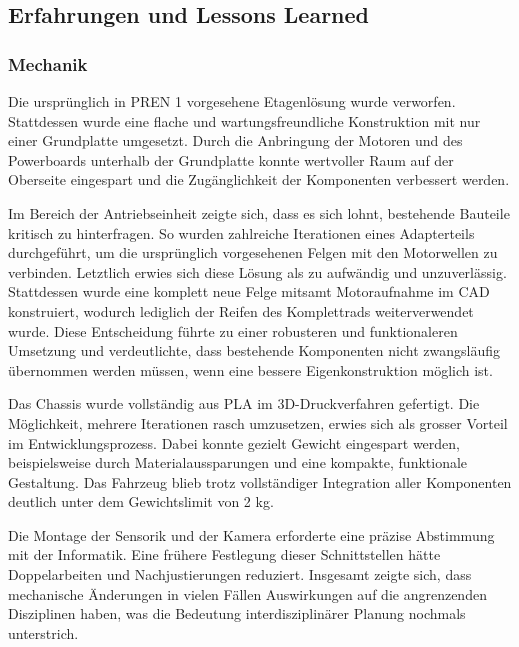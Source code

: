 \documentclass[main.tex]{subfiles} %
\begin{document}

\subsection{Erfahrungen und Lessons Learned}

\subsubsection{Mechanik}
Die ursprünglich in PREN 1 vorgesehene Etagenlösung wurde verworfen. Stattdessen wurde eine flache und 
wartungsfreundliche Konstruktion mit nur einer Grundplatte umgesetzt. Durch die Anbringung der 
Motoren und des Powerboards unterhalb der Grundplatte konnte wertvoller Raum auf der Oberseite eingespart 
und die Zugänglichkeit der Komponenten verbessert werden.

Im Bereich der Antriebseinheit zeigte sich, dass es sich lohnt, bestehende Bauteile kritisch zu hinterfragen. 
So wurden zahlreiche Iterationen eines Adapterteils durchgeführt, um die ursprünglich vorgesehenen Felgen 
mit den Motorwellen zu verbinden. Letztlich erwies sich diese Lösung als zu aufwändig und unzuverlässig. 
Stattdessen wurde eine komplett neue Felge mitsamt Motoraufnahme im CAD konstruiert, wodurch lediglich 
der Reifen des Komplettrads weiterverwendet wurde. Diese Entscheidung führte zu einer robusteren und 
funktionaleren Umsetzung und verdeutlichte, dass bestehende Komponenten nicht zwangsläufig übernommen werden 
müssen, wenn eine bessere Eigenkonstruktion möglich ist.

Das Chassis wurde vollständig aus PLA im 3D-Druckverfahren gefertigt. Die Möglichkeit, mehrere Iterationen 
rasch umzusetzen, erwies sich als grosser Vorteil im Entwicklungsprozess. Dabei konnte gezielt Gewicht 
eingespart werden, beispielsweise durch Materialaussparungen und eine kompakte, funktionale Gestaltung. 
Das Fahrzeug blieb trotz vollständiger Integration aller Komponenten deutlich unter dem Gewichtslimit von 2 kg.

Die Montage der Sensorik und der Kamera erforderte eine präzise Abstimmung mit der Informatik. Eine frühere 
Festlegung dieser Schnittstellen hätte Doppelarbeiten und Nachjustierungen reduziert. Insgesamt zeigte sich, 
dass mechanische Änderungen in vielen Fällen Auswirkungen auf die angrenzenden Disziplinen haben, was die 
Bedeutung interdisziplinärer Planung nochmals unterstrich.
\end{document}
